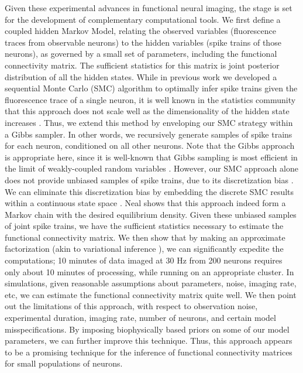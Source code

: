 Given these experimental advances in functional neural imaging, the stage is set for the development of complementary computational tools.  We first define a coupled hidden Markov Model, relating the observed variables (fluorescence traces from observable neurons) to the hidden variables (spike trains of those neurons), as governed by a small set of parameters, including the functional connectivity matrix.  The sufficient statistics for this matrix is joint posterior distribution of all the hidden states.  While in previous work \cite{VogPan09} we developed a sequential Monte Carlo (SMC) algorithm to optimally infer spike trains given the fluorescence trace of a single neuron, it is well known in the statistics community that this approach does not scale well as the dimensionality of the hidden state increases \cite{??}.  Thus, we extend this method by enveloping our SMC strategy within a Gibbs sampler.  In other words, we recursively generate samples of spike trains for each neuron, conditioned on all other neurons.  Note that the Gibbs approach is appropriate here, since it is well-known that Gibbs sampling is most efficient in the limit of weakly-coupled random variables \cite{??}.  However, our SMC approach alone does not provide unbiased samples of spike trains, due to its discretization bias \cite{??}.  We can eliminate this discretization bias by embedding the discrete SMC results within a continuous state space \cite{??}.  Neal \cite{??} shows that this approach indeed form a Markov chain with the desired equilibrium density.  Given these unbiased samples of joint spike trains, we have the sufficient statistics necessary to estimate the functional connectivity matrix.  We then show that by making an approximate factorization (akin to variational inference \cite{??}), we can significantly expedite the computations; 10 minutes of data imaged at 30 Hz from 200 neurons  requires only about 10 minutes of processing, while running on an appropriate cluster.  In simulations, given reasonable assumptions about parameters, noise, imaging rate, etc, we can estimate the functional connectivity matrix quite well. We then point out the limitations of this approach, with respect to observation noise, experimental duration, imaging rate, number of neurons, and certain  model misspecifications.  By imposing biophysically based priors on some of our model parameters, we can further improve this technique.  Thus, this approach appears to be a promising technique for the inference of functional connectivity matrices for small populations of neurons.  